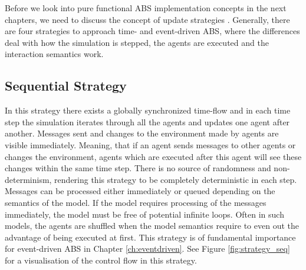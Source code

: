 Before we look into pure functional ABS implementation concepts in the next chapters, we need to discuss the concept of update strategies \cite{thaler_art_2017}. Generally, there are four strategies to approach time- and event-driven ABS, where the differences deal with how the simulation is stepped, the agents are executed and the interaction semantics work.


\subsection{Sequential Strategy}
\label{sec:seq_strategy}
In this strategy there exists a globally synchronized time-flow and in each time step the simulation iterates through all the agents and updates one agent after another. Messages sent and changes to the environment made by agents are visible immediately. Meaning, that if an agent sends messages to other agents or changes the environment, agents which are executed after this agent will see these changes within the same time step. There is no source of randomness and non-determinism, rendering this strategy to be completely deterministic in each step. Messages can be processed either immediately or queued depending on the semantics of the model. If the model requires processing of the messages immediately, the model must be free of potential infinite loops. Often in such models, the agents are shuffled when the model semantics require to even out the advantage of being executed at first. This strategy is of fundamental importance for event-driven ABS in Chapter \ref{ch:eventdriven}. See Figure \ref{fig:strategy_seq} for a visualisation of the control flow in this strategy.

